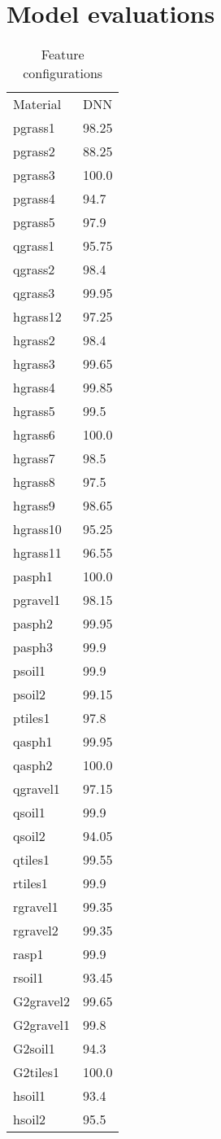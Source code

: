 \section{Model evaluations}


\begin{table}
\begin{center}
  \begin{tabular}{|l|l|}
    \rowcolor{blue!35}
Material & DNN \\
pgrass1& 98.25 \\
pgrass2& 88.25 \\
pgrass3& 100.0 \\
pgrass4& 94.7 \\
pgrass5& 97.9 \\
qgrass1& 95.75 \\
qgrass2& 98.4 \\
qgrass3& 99.95 \\
hgrass12& 97.25\\ 
hgrass2 &98.4 \\
hgrass3 &99.65 \\
hgrass4 &99.85 \\
hgrass5 &99.5 \\
hgrass6 &100.0 \\
hgrass7 &98.5 \\
hgrass8 &97.5 \\
hgrass9 &98.65 \\
hgrass10& 95.25\\ 
hgrass11& 96.55\\ 
pasph1 &100.0 \\
pgravel1& 98.15 \\
pasph2 &99.95 \\
pasph3 &99.9 \\
psoil1 &99.9 \\
psoil2 &99.15 \\
ptiles1& 97.8 \\
qasph1& 99.95 \\
qasph2& 100.0 \\
qgravel1& 97.15 \\
qsoil1 &99.9 \\
qsoil2& 94.05 \\
qtiles1& 99.55 \\
rtiles1 &99.9 \\
rgravel1& 99.35 \\
rgravel2 &99.35 \\
rasp1 &99.9 \\
rsoil1 &93.45 \\
G2gravel2& 99.65\\ 
G2gravel1& 99.8 \\
G2soil1 &94.3 \\
G2tiles1& 100.0 \\
hsoil1 &93.4 \\
hsoil2 &95.5
  \end{tabular}
\end{center}
\caption{Feature configurations}
\end{table}


